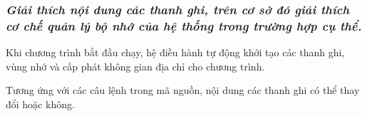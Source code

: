 \subsubsection{\textit{Giải thích nội dung các thanh ghi, trên cơ sở đó giải thích cơ chế quản lý bộ nhớ của hệ thống trong trường hợp cụ thể.}}

\vspace{0.4cm}

\noindent\large 
Khi chương trình bắt đầu chạy, hệ điều hành tự động khởi tạo các thanh ghi, vùng nhớ và cấp phát không gian địa chỉ cho chương trình.

\vspace{0.4cm}

\noindent\large 
Tương ứng với các câu lệnh trong mã nguồn, nội dung các thanh ghi có thể thay đổi hoặc không.

\vspace{0.5cm}

